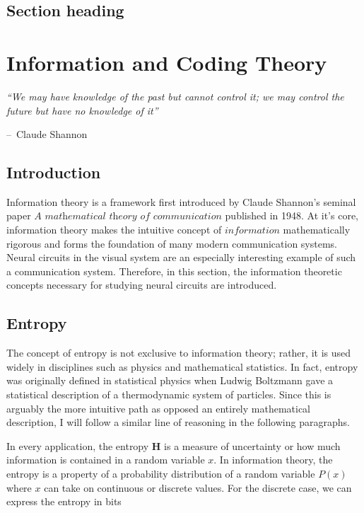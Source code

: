 \documentclass[a4paper,11pt]{book}
\makeatletter
\newenvironment{chapquote}[2][2em]
  {\setlength{\@tempdima}{#1}%
   \def\chapquote@author{#2}%
   \parshape 1 \@tempdima \dimexpr\textwidth-2\@tempdima\relax%
   \itshape}
  {\par\normalfont\hfill--\ \chapquote@author\hspace*{\@tempdima}\par\bigskip}
\makeatother
\begin{document}
\section{Section heading}

\chapter{Information and Coding Theory}

\begin{chapquote}{Claude Shannon}
``We may have knowledge of the past but cannot control it; we may control the future but have no knowledge of it''
\end{chapquote}

\section{Introduction}

Information theory is a framework first introduced by Claude Shannon's seminal paper $\textit{A mathematical theory of communication}$  published in 1948. At it's core, information theory makes the intuitive concept of $\textit{information}$ mathematically rigorous and forms the foundation of many modern communication systems. Neural circuits in the visual system are an especially interesting example of such a communication system. Therefore, in this section, the information theoretic concepts necessary for studying neural circuits are introduced. 

\section{Entropy}

The concept of entropy is not exclusive to information theory; rather, it is used widely in disciplines such as physics and mathematical statistics. In fact, entropy was originally defined in statistical physics when Ludwig Boltzmann gave a statistical description of a thermodynamic system of particles. Since this is arguably the more intuitive path as opposed an entirely mathematical description, I will follow a similar line of reasoning in the following paragraphs.

In every application, the entropy $\mathbf{H}$ is a measure of uncertainty or how much information is contained in a random variable $x$. In information theory, the entropy is a property of a probability distribution of a random variable $P(x)$ where $x$ can take on continuous or discrete values. For the discrete case, we can express the entropy in bits 
\end{document}
